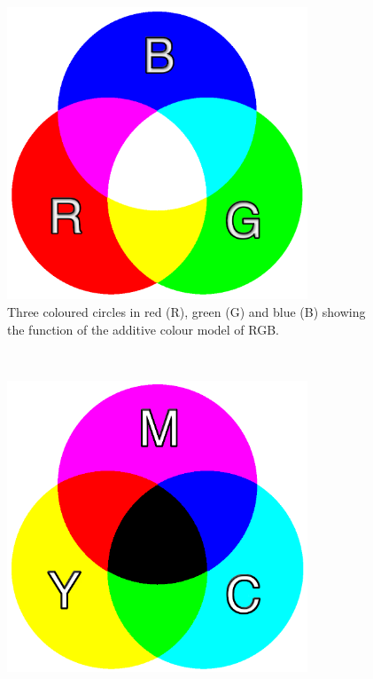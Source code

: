 \documentclass[../MasterThesis.tex]{subfiles}
\begin{document}
\begin{minipage}{0.48\textwidth}
	\begin{figure}[H]
		
		\centering
		
		\includegraphics[width=0.8\textwidth]{RGB.png}
		
		\caption[Additive colour model of RGB]{Three coloured circles in red (R), green (G) and blue (B) showing the function of the additive colour model of RGB.}
		\label{figure:RGB}
		
	\end{figure}
\end{minipage}\begin{minipage}{0.04\textwidth}
\ 
\end{minipage}\begin{minipage}{0.48\textwidth}
\begin{figure}[H]
	
	\centering
	
	\includegraphics[width=0.8\textwidth]{YMCA.png}
	

\end{figure}
\end{minipage}
\end{document}
